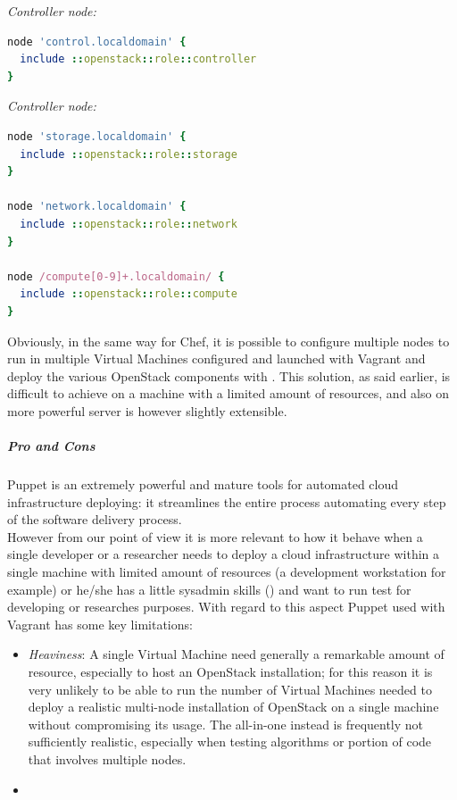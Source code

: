 \textit{Controller node:}
\begin{lstlisting}[language=Ruby,numbers=none]
node 'control.localdomain' {
  include ::openstack::role::controller
}
\end{lstlisting}

\textit{Controller node:}
\begin{lstlisting}[language=Ruby,numbers=none]
node 'storage.localdomain' {
  include ::openstack::role::storage
}

node 'network.localdomain' {
  include ::openstack::role::network
}

node /compute[0-9]+.localdomain/ {
  include ::openstack::role::compute
}
\end{lstlisting}

Obviously, in the same way for Chef, it is possible to configure multiple nodes to run in multiple Virtual Machines configured and launched with Vagrant and deploy the various OpenStack components with . This solution, as said earlier, is difficult to achieve on a machine with a limited amount of resources, and also on more powerful server is however slightly extensible.

\subparagraph{Pro and Cons}
\label{subp:sota_puppet_pro_cons}
Puppet is an extremely powerful and mature tools for automated cloud infrastructure deploying: it streamlines the entire process automating every step of the software delivery process.\\
However from our point of view it is more relevant to how it behave when a single developer or a researcher needs to deploy a cloud infrastructure within a single machine with limited amount of resources (a development workstation for example) or he/she has a little sysadmin skills () and want to run test for developing or researches purposes. With regard to this aspect Puppet used with Vagrant has some key limitations:

\begin{itemize}
\item \textit{Heaviness}: A single Virtual Machine need generally a remarkable amount of resource, especially to host an OpenStack installation; for this reason it is very unlikely to be able to run the number of Virtual Machines needed to deploy a realistic multi-node installation of OpenStack on a single machine without compromising its usage. The all-in-one instead is frequently not sufficiently realistic, especially when testing algorithms or portion of code that involves multiple nodes.
\item {}
\end{itemize}

